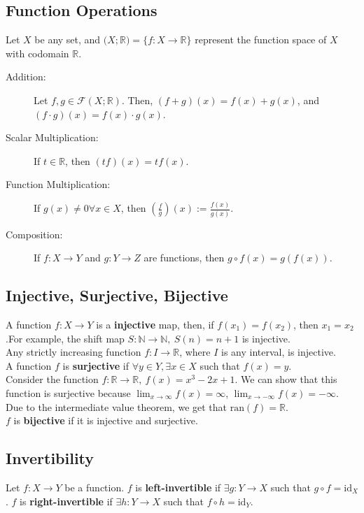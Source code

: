 \documentclass[10pt]{extarticle}
\begin{document}
  \subsection{Function Operations}%
      Let $X$ be any set, and $\mathcal(X;\mathbb{R}) = \{f:X\rightarrow \mathbb{R}\}$ represent the function space of $X$ with codomain $\mathbb{R}$.
    \begin{description}
      \item[Addition:] Let $f,g\in \mathcal{F}(X;\mathbb{R})$. Then, $(f+g)(x) = f(x) + g(x)$, and $(f\cdot g)(x) = f(x)\cdot g(x)$.
      \item[Scalar Multiplication:]If $t\in \mathbb{R}$, then $(tf)(x) = tf(x)$.
      \item[Function Multiplication:] If $g(x)\neq 0\forall x\in X$, then $\left(\frac{f}{g}\right)(x) := \frac{f(x)}{g(x)}$.
      \item[Composition:] If $f:X\rightarrow Y$ and $g:Y\rightarrow Z$ are functions, then $g\circ f(x) = g(f(x))$.
    \end{description}
    \subsection{Injective, Surjective, Bijective}%
      A function $f:X\rightarrow Y$ is a \textbf{injective} map, then, if $f(x_1) = f(x_2)$, then $x_1 = x_2$.For example, the shift map $S:\mathbb{N} \rightarrow \mathbb{N},~S(n) = n+1$ is injective.\\

      Any strictly increasing function $f:I\rightarrow \mathbb{R}$, where $I$ is any interval, is injective.\\

      A function $f$ is \textbf{surjective} if $\forall y\in Y, \exists x\in X$ such that $f(x) = y$.\\

      Consider the function $f:\mathbb{R} \rightarrow \mathbb{R},~f(x) = x^3-2x+1$. We can show that this function is surjective because $\lim_{x\rightarrow \infty}f(x) = \infty$, $\lim_{x\rightarrow -\infty} f(x) = -\infty$. Due to the intermediate value theorem, we get that $\text{ran}(f) = \mathbb{R}$.\\

      $f$ is \textbf{bijective} if it is injective and surjective.
    \subsection{Invertibility}%
      Let $f:X\rightarrow Y$ be a function. $f$ is \textbf{left-invertible} if $\exists g:Y\rightarrow X$ such that $g\circ f = \text{id}_X$. $f$ is \textbf{right-invertible} if $\exists h:Y\rightarrow X$ such that $f\circ h = \text{id}_Y$.\\
\end{document}
